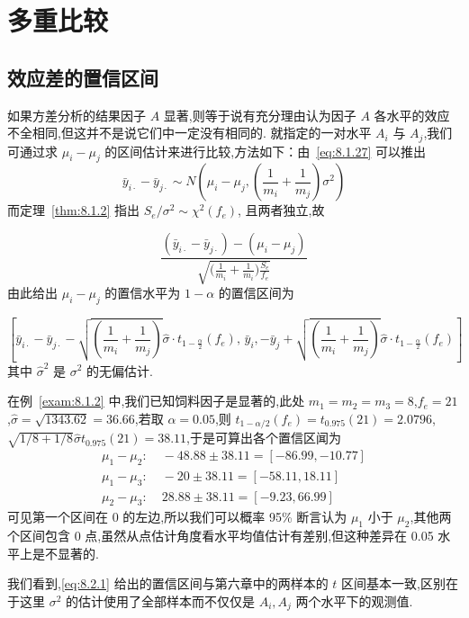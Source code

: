 \section{多重比较}\label{sec:8.2}
\subsection{效应差的置信区间} \label{ssec:8.2.1}
如果方差分析的结果因子 $A$ 显著,则等于说有充分理由认为因子 $A$ 各水平的效应不全相同,但这并不是说它们中一定没有相同的. 就指定的一对水平 $A_i$ 与 $A_j$,我们可通过求 $\mu_i - \mu_j$ 的区间估计来进行比较,方法如下：由~\eqref{eq:8.1.27} 可以推出
\begin{equation*}
  \bar{y}_{i\cdot} - \bar{y}_{j\cdot} \sim N \left(\mu_{i}-\mu_{j},\left(\frac{1}{m_{i}}+\frac{1}{m_{j}}\right) \sigma^{2}\right)
\end{equation*}
而定理~\ref{thm:8.1.2} 指出 $S_e/\sigma^2 \sim \chi^2(f_e)$, 且两者独立,故

\begin{equation*}
  \frac{(\bar{y}_{i\cdot} - \bar{y}_{j\cdot}) - (\mu_i - \mu_j) }{\sqrt{\big(\frac{1}{m_i} + \frac{1}{m_i}\big) \frac{S_e}{f_e}}}
\end{equation*}
由此给出 $\mu_i -\mu_j$ 的置信水平为 $1-\alpha$ 的置信区间为

\begin{equation}\label{eq:8.2.1}
  \left[\bar{y}_{i\cdot}-\bar{y}_{j\cdot}-\sqrt{\left(\frac{1}{m_{i}}+\frac{1}{m_{j}}\right)} \hat{\sigma} \cdot t_{1-\frac{\alpha}{2}}\left(f_{e}\right),\,\bar{y}_{i},-\bar{y}_{j}+\sqrt{\left(\frac{1}{m_{i}}+\frac{1}{m_{j}}\right)} \hat{\sigma} \cdot t_{1-\frac{\alpha}{2}}\left(f_{e}\right)\right]
\end{equation}
其中 $\hat{\sigma}^2$ 是 $\sigma^2$ 的无偏估计.

\begin{example}\label{exam:8.2.1}
在例~\ref{exam:8.1.2} 中,我们已知饲料因子是显著的,此处 $m_1=m_2=
m_3 = 8$,$f_e = 21$,$\hat{\sigma}=\sqrt{1343.62} = 36.66$,若取 $\alpha=0.05$,则 $t_{1-\alpha/2}(f_e)=
t_{0.975}(21) = 2.0796$, $\sqrt{1/8+1/8} \hat{\sigma} t_{0.975}(21) = 38.11$,于是可算出各个置信区闻为
\begin{align*}
\mu_{1}-\mu_{2} : &\; -48.88 \pm 38.11=[-86.99,-10.77] \\
\mu_{1}-\mu_{3} : &\; -20 \pm 38.11=[-58.11,18.11] \\
\mu_{2}-\mu_{3} : &\; 28.88 \pm 38.11=[-9.23,66.99]
\end{align*}
可见第一个区间在 0 的左边,所以我们可以概率 95\% 断言认为 $\mu_1$ 小于 $\mu_2$,其他两个区间包含 0 点,虽然从点估计角度看水平均值估计有差别,但这种差异在 0.05 水平上是不显著的.

我们看到,\eqref{eq:8.2.1} 给出的置信区间与第六章中的两样本的 $t$ 区间基本一致,区别在于这里 $\sigma^2$ 的估计使用了全部样本而不仅仅是 $A_i, A_j$ 两个水平下的观测值.
\end{example}

